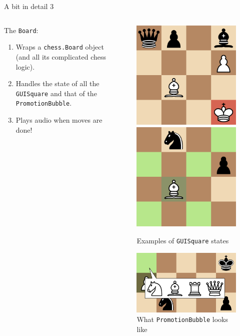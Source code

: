 \documentclass[english]{beamer}
\begin{document}
\begin{frame}{A bit in detail 3}
    \begin{columns}
        \begin{column}{.5\textwidth}
            The \texttt{Board}:
            \begin{enumerate}
                \item Wraps a \texttt{chess.Board} object (and all its complicated chess logic).
                \item Handles the state of all the \texttt{GUISquare} and that of the \texttt{PromotionBubble}.
                \item Plays audio when moves are done!
            \end{enumerate}
        \end{column}
        \begin{column}{.5\textwidth}
            \begin{figure}
                \centering
                \includegraphics[width=.4\textwidth]{images/check_coloring.png}
                \includegraphics[width=.4\textwidth]{images/moves_coloring.png}
                \caption{Examples of \texttt{GUISquare} states}
                \includegraphics[width=.65\textwidth]{images/promotion_ex.png}
                \caption{What \texttt{PromotionBubble} looks like}
            \end{figure}
        \end{column}
    \end{columns}
\end{frame}
\end{document}
